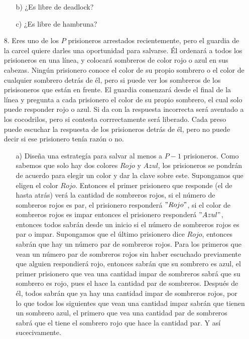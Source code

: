 \documentclass[12pt, letterpaper]{article}
\begin{document}
\begin{itemize}
\begin{itemize}
\item[b) ] ¿Es libre de deadlock?

\item[c) ] ¿Es libre de hambruna?
\end{itemize}



\item[8. ] Eres uno de los $P$ prisioneros arrestados recientemente, pero el guardia de la carcel quiere darles una oportunidad para salvarse. Él ordenará a todos los prisioneros en una línea, y colocará sombreros de color rojo o azul en sus cabezas. Ningún prisionero conoce el color de su propio sombrero o el color de cualquier sombrero detrás de él, pero si puede ver los sombreros de los prisisoneros que están en frente. El guardia comenzará desde el final de la línea y pregunta a cada prisionero el color de su propio sombrero, el cual solo puede responder rojo o azul. Si da con la respuesta incorrecta será aventado a los cocodrilos, pero si contesta corrrectamente será liberado. Cada preso puede escuchar la respuesta de los prisioneros detrás de él, pero no puede decir si ese prisionero tenía razón o no.

\begin{itemize}
\item[a) ] Diseña una estrategía para salvar al menos a $P-1$ prisioneros.
Como sabemos que solo hay dos colores $Rojo$ y $Azul$, los prisioneros se pondrán de acuerdo para elegir un color y dar la clave sobre este. Supongamos que eligen el color $Rojo$. Entonces el primer prisionero que responde (el de hasta atrás) verá la cantidad de sombreros rojos, si el número de sombreros rojos es par, el prisionero responderá $"Rojo"$, si el color de sombreros rojos es impar entonces el prisionero responderá $"Azul"$, entonces todos sabrán desde un inicio si el número de sombreros rojos es par o impar. Supongamos que el último prisionero dice $Rojo$, entonces sabrán que hay un número par de sombreros rojos. Para los primeros que vean un número par de sombreros rojos sin haber escuchado previamente que alguien respondierá rojo, entonces sabrán que su sombrero es azul, el primer prisionero que vea una cantidad impar de sombreros sabrá que su sombrero es rojo, pues el hace la cantidad par de sombreros. Después de él, todos sabrán que ya hay una cantidad impar de sombreros rojos, por lo que todos los siguientes que vean una cantidad impar sabrán que tienen un sombrero azul, el primero que vea una cantidad par de sombreros sabrá que el tiene el sombrero rojo que hace la cantidad par. Y así sucecivamente.


\end{itemize}
\end{itemize}
\end{document}
